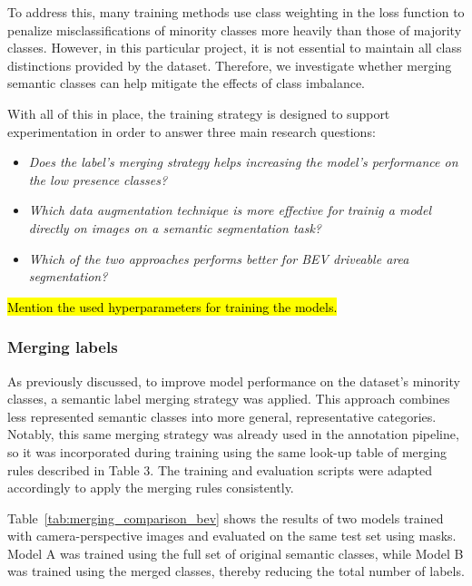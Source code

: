 To address this, many training methods use class weighting in the loss function to penalize misclassifications of minority classes more heavily than those of majority classes. However, in this particular project, it is not essential to maintain all class distinctions provided by the dataset. Therefore, we investigate whether merging semantic classes can help mitigate the effects of class imbalance.

With all of this in place, the training strategy is designed to support experimentation in order to answer three main research questions:

\begin{itemize}
    \item \textit{Does the label's merging strategy helps increasing the model's performance on the low presence classes?}
    \item \textit{Which data augmentation technique is more effective for trainig a model directly on  images on a semantic segmentation task?}
    \item \textit{Which of the two approaches performs better for BEV driveable area segmentation?}
\end{itemize}

\hl{Mention the used hyperparameters for training the models.}

\subsubsection{Merging labels} \label{sec:merging_labels}
As previously discussed, to improve model performance on the dataset’s minority classes, a semantic label merging strategy was applied. This approach combines less represented semantic classes into more general, representative categories. Notably, this same merging strategy was already used in the annotation pipeline, so it was incorporated during training using the same look-up table of merging rules described in Table 3. The training and evaluation scripts were adapted accordingly to apply the merging rules consistently.

Table~\ref{tab:merging_comparison_bev} shows the results of two models trained with camera-perspective images and evaluated on the same test set using  masks. Model A was trained using the full set of original semantic classes, while Model B was trained using the merged classes, thereby reducing the total number of labels. 

